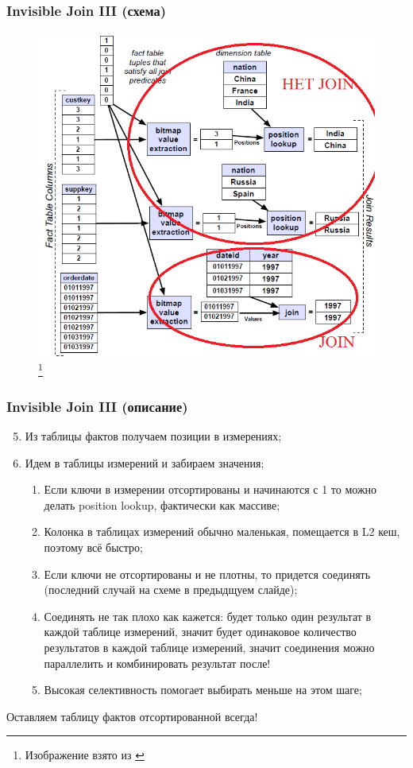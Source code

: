 \documentclass{beamer}
\begin{document}
\begin{frame}
\frametitle{Invisible Join III (схема)}

\begin{figure}[htb]
\includegraphics[width=\textwidth,height=0.800\textheight,keepaspectratio]{i3.png} 
\footnote{\tiny{Изображение взято из \cite{Abadi2008}}}
\end{figure}   

\end{frame}

\begin{frame}
\frametitle{Invisible Join III (описание)}

\begin{enumerate}
  \setcounter{enumi}{4}
  \item Из таблицы фактов получаем позиции в измерениях;
  \item Идем в таблицы измерений и забираем значения;
  \begin{enumerate}
    \item Если ключи в измерении отсортированы и начинаются с 1 то можно делать position lookup, фактически как массиве;
    \item Колонка в таблицах измерений обычно маленькая, помещается в L2 кеш, поэтому всё быстро;  
    \item Если ключи не отсортированы и не плотны, то придется соединять (последний случай на схеме в предыдщуем слайде);
    \item Соединять не так плохо как кажется: будет только один результат в каждой таблице измерений, значит будет одинаковое количество результатов в каждой таблице измерений, значит соединения можно параллелить и комбинировать результат после!
    \item Высокая селективность помогает выбирать меньше на этом шаге;
  \end{enumerate}  
\end{enumerate}

Оставляем таблицу фактов отсортированной всегда!

\end{frame}
\end{document}

